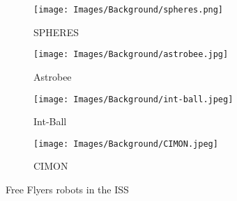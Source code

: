 \begin{figure}[H]
    \centering
    \begin{subfigure}[b]{0.45\textwidth}
        \centering
        \texttt{[image: Images/Background/spheres.png]}
        \caption{SPHERES}
        \label{fig: BackGround: Space Robots: Free Flyers: SPHERES}
    \end{subfigure}
    \hfill
    \begin{subfigure}[b]{0.45\textwidth}
        \centering
        \texttt{[image: Images/Background/astrobee.jpg]}
        \caption{Astrobee}
        \label{fig: BackGround: Space Robots: Free Flyers: Astrobee}
    \end{subfigure}
    
    \begin{subfigure}[b]{0.45\textwidth}
        \centering
        \texttt{[image: Images/Background/int-ball.jpeg]}
        \caption{Int-Ball}
        \label{fig: BackGround: Space Robots: Free Flyers: Int-Ball}
    \end{subfigure}
    \hfill
    \begin{subfigure}[b]{0.45\textwidth}
        \centering
        \texttt{[image: Images/Background/CIMON.jpeg]}
        \caption{CIMON}
        \label{fig: BackGround: Space Robots: Free Flyers: CIMON}
    \end{subfigure}
    
    \caption{Free Flyers robots in the ISS}
    \label{fig: BackGround: Space Robots: Free Flyers}
\end{figure}